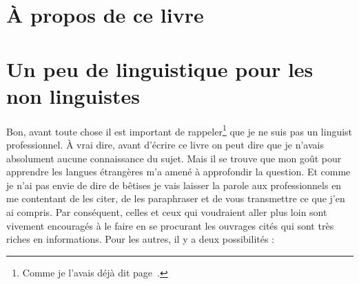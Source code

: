 \documentclass[12pt,a4paper, xetex, hyperref]{book}
\begin{document}



\author{Laurent Garnier}




\dominitoc
{}


\frontmatter


\renewcommand{\epigraphflush}{flushleft}
\part{À propos de ce livre}

   \renewcommand{\epigraphflush}{flushright}

   \parttoc

   

   

   \newpage
   \listoffigures
   \listoftables
   \newpage

   \mainmatter
   \parttoc

\part{Un peu de linguistique pour les non linguistes}

    \newpage
    \minitoc
    \newpage

    Bon, avant toute chose il est important de rappeler\footnote{Comme je
      l'avais déjà dit page~\pageref{sec:phonetics}.} que je ne suis pas
    un \gls{linguist} professionnel. À vrai dire, avant d'écrire ce livre on
    peut dire que je n'avais absolument aucune connaissance du sujet. Mais
    il se trouve que mon goût pour apprendre les langues étrangères m'a
    amené à approfondir la question. Et comme je n'ai pas envie de dire de
    bêtises je vais laisser la parole aux professionnels en me contentant
    de les citer, de les paraphraser et de vous transmettre ce que j'en ai
    compris. Par conséquent, celles et ceux qui voudraient aller plus loin
    sont vivement encouragés à le faire en se procurant les ouvrages cités
    qui sont très riches en informations. Pour les autres, il y a deux
    possibilités :
    
\end{document}
